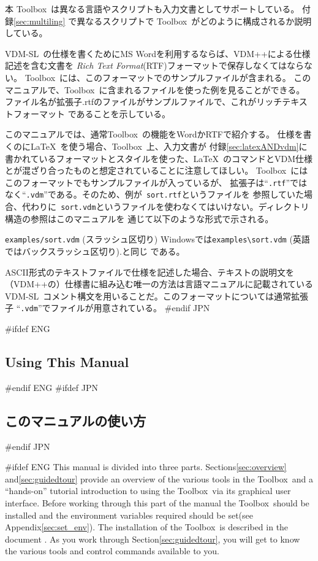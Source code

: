 \documentclass[\pformat,12pt]{article}
\newcommand{\vdmslpp}{VDM-SL}
\newcommand{\Toolbox}{Toolbox}
\newcommand{\vdmext}{vdm}
\newcommand{\vdmslpp}{VDM++}
\newcommand{\Toolbox}{Toolbox}
\newcommand{\vdmext}{vpp}
\begin{document}
本 \Toolbox\ は異なる言語やスクリプトも入力文書としてサポートしている。
付録\ref{sec:multiling}
で異なるスクリプトで \Toolbox\ がどのように構成されるか説明している。

\vdmslpp\ の仕様を書くためにMS Wordを利用するならば、VDM++による仕様記述を含む文書を
{\em Rich Text Format\/}(RTF)フォーマットで保存しなくてはならない。
\Toolbox\ には、このフォーマットでのサンプルファイルが含まれる。
このマニュアルで、\Toolbox\ に含まれるファイルを使った例を見ることができる。
ファイル名が拡張子.rtfのファイルがサンプルファイルで、これがリッチテキストフォーマット
であることを示している。

このマニュアルでは、通常\Toolbox\ の機能をWordかRTFで紹介する。
仕様を書くのに\LaTeX\ を使う場合、\Toolbox\ 上、入力文書が
付録\ref{sec:latexANDvdm}に書かれているフォーマットとスタイルを使った、\LaTeX\ 
のコマンドとVDM仕様とが混ざり合ったものと想定されていることに注意してほしい。
\Toolbox\ にはこのフォーマットでもサンプルファイルが入っているが、
拡張子は``{\tt .rtf}''ではなく``{\tt .\vdmext}''である。そのため、例が{\tt
  sort.rtf}というファイルを
参照していた場合、代わりに{\tt
  sort.\vdmext}というファイルを使わなくてはいけない。ディレクトリ構造の参照はこのマニュアルを
通じて以下のような形式で示される。

{\tt examples/sort.vdm} (スラッシュ区切り)  
Windowsでは\verb+examples\sort.vdm+ (英語ではバックスラッシュ区切り).と同じ
である。

ASCII形式のテキストファイルで仕様を記述した場合、テキストの説明文を
（VDM++の）仕様書に組み込む唯一の方法は言語マニュアルに記載されている
\vdmslpp\ コメント構文を用いることだ。このフォーマットについては通常拡張子
``{\tt .\vdmext}''でファイルが用意されている。
#endif JPN

#ifdef ENG
\subsection*{Using This Manual}
#endif ENG
#ifdef JPN
\subsection*{このマニュアルの使い方}
#endif JPN

#ifdef ENG
This manual is divided into three parts. Sections\ref{sec:overview}
and\ref{sec:guidedtour} provide an overview of the various tools in
the \Toolbox\ and a ``hands-on'' tutorial introduction to using the
\Toolbox\ via its graphical user interface.  Before working through
this part of the manual the \Toolbox\ should be installed and the
environment variables required should be set(see
Appendix\ref{sec:set_env}). The installation of the \Toolbox\ is
described in the document
.
As you work through Section\ref{sec:guidedtour}, you will get to know
the various tools and control commands available to you.
\end{document}
